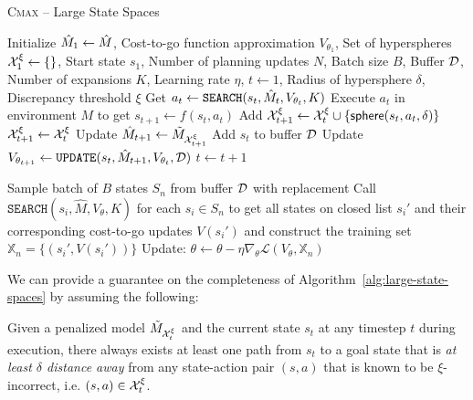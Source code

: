 \begin{algorithm}[t]
  \caption{\textsc{Cmax} -- Large State Spaces}
  {\normalsize
  \begin{algorithmic}[1]
    \State Initialize $\hat{M}_1 \leftarrow \hat{M}$,
    Cost-to-go function approximation $V_{\theta_1}$, Set of
    hyperspheres $\mathcal{X}^\xi_1 \leftarrow \{\}$, Start state
    $s_1$, Number of planning updates $N$, Batch size $B$, Buffer
    $\mathcal{D}$, Number of expansions $K$,
    Learning rate $\eta$, $t \leftarrow 1$, Radius of hypersphere
    $\delta$, Discrepancy threshold $\xi$
    \State Get $a_t \leftarrow \mathtt{SEARCH}(s_t, \hat{M}_t,
    V_{\theta_{t}}, K)$
    \State Execute $a_t$ in environment $M$ to get $s_{t+1} \leftarrow
    f(s_t, a_t)$
    \State Add $\mathcal{X}_{t+1}^\xi \leftarrow
    \mathcal{X}_t^\xi \cup \{\mathsf{sphere}(s_t, a_t, \delta)\}$
    \Else
    \State $\mathcal{X}_{t+1}^\xi \leftarrow \mathcal{X}_t^\xi$
    \EndIf
    \State Update $\hat{M}_{t+1} \leftarrow
    \tilde{M}_{\mathcal{X}_{t+1}^\xi}$
    \State Add $s_t$ to buffer $\mathcal{D}$
    \State Update $V_{\theta_{t+1}} \leftarrow
    \mathtt{UPDATE}(s_t, \hat{M}_{t+1}, V_{\theta_t}, \mathcal{D})$
    \State $t \leftarrow t + 1$
    \EndWhile

    \State Sample batch of $B$ states $S_n$ from buffer $\mathcal{D}$
    with replacement\label{line:iteration-start}
    \State Call $\mathtt{SEARCH}(s_i, \hat{M}, V_\theta, K)$ for each
    $s_i \in S_n$ to get all states on closed list $s_i'$ and their corresponding cost-to-go updates $V(s_i')$
    and construct the training set $\mathbb{X}_n = \{(s_i', V(s_i'))\}$
    \State Update: $\theta \leftarrow \theta - \eta\nabla_\theta
    \mathcal{L}(V_\theta, \mathbb{X}_n)$\label{line:iteration-end}
    \EndFor
    \EndFunction
  \end{algorithmic}}
\label{alg:large-state-spaces}
\end{algorithm}

We can provide a guarantee on the completeness of
Algorithm~\ref{alg:large-state-spaces} by assuming the following: 
\begin{assumption}
  Given a penalized model $\tilde{M}_{\mathcal{X}_t^\xi}$ and
  the current state $s_t$ at any timestep $t$ during execution, there
  always exists at least one path from $s_t$ to a goal state that is
  \textit{at least $\delta$ distance away} from any state-action pair $(s, a)$ 
  that is known to be $\xi$-incorrect, i.e. $(s, a) \in \mathcal{X}_t^\xi$.
  \label{assumption:core-large}
\end{assumption}

